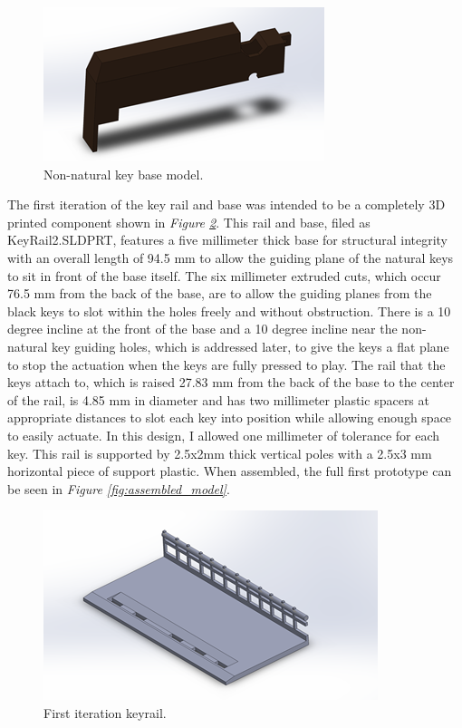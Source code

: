 \begin{figure}[h!]
  \centering
  \includegraphics[width=0.7\linewidth]{image/BlackModel.png}
  \caption{Non-natural key base model.}
  \label{fig:black_model}
\end{figure}

The first iteration of the key rail and base was intended to be a completely 3D printed component shown in \textit{Figure \ref{fig:base_model1}}. This rail and base, filed as KeyRail2.SLDPRT, features a five millimeter thick base for structural integrity with an overall length of 94.5 mm to allow the guiding plane of the natural keys to sit in front of the base itself. The six millimeter extruded cuts, which occur 76.5 mm from the back of the base, are to allow the guiding planes from the black keys to slot within the holes freely and without obstruction. There is a 10 degree incline at the front of the base and a 10 degree incline near the non-natural key guiding holes, which is addressed later, to give the keys a flat plane to stop the actuation when the keys are fully pressed to play. The rail that the keys attach to, which is raised 27.83 mm from the back of the base to the center of the rail, is 4.85 mm in diameter and has two millimeter plastic spacers at appropriate distances to slot each key into position while allowing enough space to easily actuate. In this design, I allowed one millimeter of tolerance for each key. This rail is supported by 2.5x2mm thick vertical poles with a 2.5x3 mm horizontal piece of support plastic. When assembled, the full first prototype can be seen in \textit{Figure \ref{fig:assembled_model}}.

\begin{figure}[h!]
  \centering
  \includegraphics[width=0.8\linewidth]{image/BaseModel1.png}
  \caption{First iteration keyrail.}
  \label{fig:base_model1}
\end{figure}

